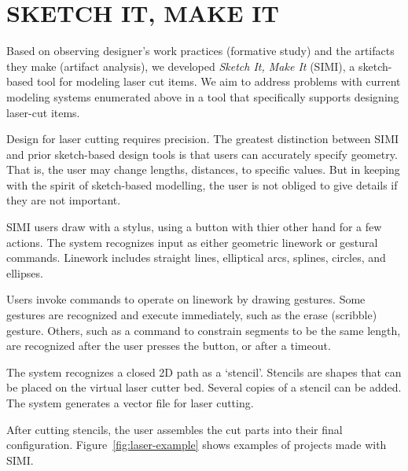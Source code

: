 \documentclass{article}
\begin{document}


\section{SKETCH IT, MAKE IT}

Based on observing designer's work practices (formative study) and the
artifacts they make (artifact analysis), we developed \textit{Sketch
  It, Make It} (SIMI), a sketch-based tool for modeling laser cut
items. We aim to address problems with current modeling systems
enumerated above in a tool that specifically supports designing
laser-cut items.

Design for laser cutting requires precision. The greatest distinction
between SIMI and prior sketch-based design tools is that users can
accurately specify geometry. That is, the user may change lengths,
distances, to specific values. But in keeping with the spirit of
sketch-based modelling, the user is not obliged to give details if
they are not important.

SIMI users draw with a stylus, using a button with thier other hand
for a few actions. The system recognizes input as either geometric
linework or gestural commands. Linework includes straight lines,
elliptical arcs, splines, circles, and ellipses.

Users invoke commands to operate on linework by drawing gestures. Some
gestures are recognized and execute immediately, such as the erase
(scribble) gesture. Others, such as a command to constrain segments to
be the same length, are recognized after the user presses the button,
or after a timeout.

The system recognizes a closed 2D path as a `stencil'. Stencils are
shapes that can be placed on the virtual laser cutter bed. Several
copies of a stencil can be added. The system generates a vector file
for laser cutting.

After cutting stencils, the user assembles the cut parts into their
final configuration. Figure~\ref{fig:laser-example} shows examples of
projects made with SIMI.
\end{document}
